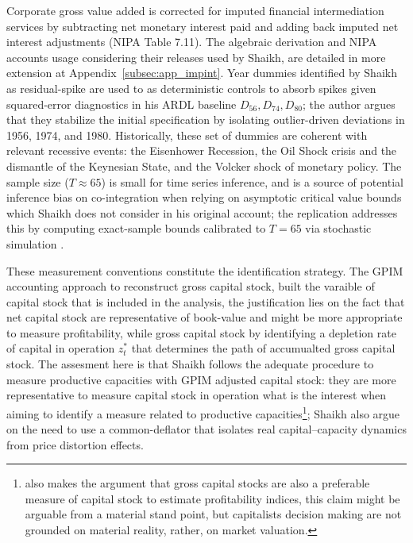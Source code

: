 \documentclass[11pt]{article}
\begin{document}
Corporate gross value added is corrected for imputed financial intermediation services by subtracting net monetary interest paid and adding back imputed net interest adjustments (NIPA Table 7.11). The algebraic derivation and NIPA accounts usage considering their releases used by Shaikh, are detailed in more extension at Appendix~\ref{subsec:app_impint}. Year dummies identified by Shaikh as residual-spike are used to as deterministic controls  to absorb spikes given squared-error diagnostics \citep{Patterson2000} in his ARDL baseline $D_{56}, D_{74}, D_{80}$; the author argues that they stabilize the initial specification by isolating outlier-driven deviations in 1956, 1974, and 1980. Historically, these set of dummies are coherent with relevant recessive events: the Eisenhower Recession, the Oil Shock crisis and the dismantle of the Keynesian State, and the Volcker shock of monetary policy. The sample size ($T \approx 65$) is small for time series inference, and is a source of potential inference bias on co-integration when relying on asymptotic critical value bounds which Shaikh does not consider in his original account; the replication addresses this by computing exact-sample bounds calibrated to $T=65$ via stochastic simulation \citep{NatsiopoulosTzeremes2022}.

These measurement conventions constitute the identification strategy. The GPIM accounting approach to reconstruct gross capital stock, built the varaible of capital stock that is included in the analysis, the justification lies on the fact that net capital stock are representative of book-value and might be more appropriate to measure profitability, while gross capital stock by identifying a depletion rate of capital in operation $z_t^*$ that determines the path of accumualted gross capital stock. The assesment here is that Shaikh follows the adequate procedure to measure productive capacities with GPIM adjusted capital stock: they are more representative to measure capital stock in operation what is the interest when aiming to identify a measure related to productive capacities\footnote{\citet{Shaikh2016} also makes the argument that gross capital stocks are also a preferable measure of capital stock to estimate profitability indices, this claim might be arguable from a material stand point, but capitalists decision making are not grounded on material reality, rather, on market valuation.}; Shaikh also argue on the need to use a common-deflator that isolates real capital--capacity dynamics from price distortion effects. 
\end{document}
